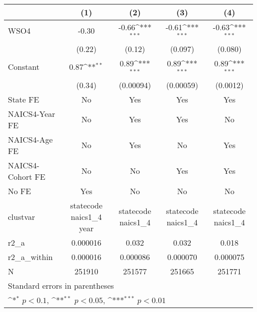 {
\def\sym#1{\ifmmode^{#1}\else\(^{#1}\)\fi}
\begin{tabular}{l*{4}{c}}
\hline\hline
                    &\multicolumn{1}{c}{(1)}         &\multicolumn{1}{c}{(2)}         &\multicolumn{1}{c}{(3)}         &\multicolumn{1}{c}{(4)}         \\
\hline
WSO4                &       -0.30         &       -0.66\sym{***}&       -0.61\sym{***}&       -0.63\sym{***}\\
                    &      (0.22)         &      (0.12)         &     (0.097)         &     (0.080)         \\
[1em]
Constant            &        0.87\sym{**} &        0.89\sym{***}&        0.89\sym{***}&        0.89\sym{***}\\
                    &      (0.34)         &   (0.00094)         &   (0.00059)         &    (0.0012)         \\
[1em]
State FE            &          No         &         Yes         &         Yes         &         Yes         \\
[1em]
NAICS4-Year FE      &          No         &         Yes         &         Yes         &          No         \\
[1em]
NAICS4-Age FE       &          No         &         Yes         &          No         &         Yes         \\
[1em]
NAICS4-Cohort FE    &          No         &          No         &         Yes         &         Yes         \\
[1em]
No FE               &         Yes         &          No         &          No         &          No         \\
\hline
clustvar            &statecode naics1\_4 year         &statecode naics1\_4         &statecode naics1\_4         &statecode naics1\_4         \\
r2\_a                &    0.000016         &       0.032         &       0.032         &       0.018         \\
r2\_a\_within         &    0.000016         &    0.000086         &    0.000070         &    0.000075         \\
N                   &      251910         &      251577         &      251665         &      251771         \\
\hline\hline
\multicolumn{5}{l}{\footnotesize Standard errors in parentheses}\\
\multicolumn{5}{l}{\footnotesize \sym{*} \(p<0.1\), \sym{**} \(p<0.05\), \sym{***} \(p<0.01\)}\\
\end{tabular}
}
